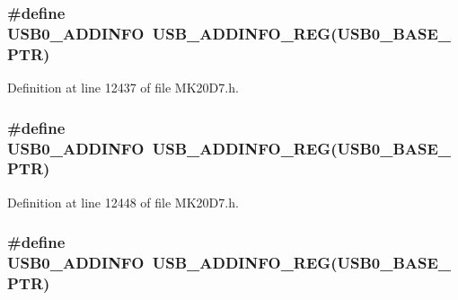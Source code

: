 \subsubsection[{\texorpdfstring{U\+S\+B0\+\_\+\+A\+D\+D\+I\+N\+FO}{USB0_ADDINFO}}]{\setlength{\rightskip}{0pt plus 5cm}\#define U\+S\+B0\+\_\+\+A\+D\+D\+I\+N\+FO~{\bf U\+S\+B\+\_\+\+A\+D\+D\+I\+N\+F\+O\+\_\+\+R\+EG}({\bf U\+S\+B0\+\_\+\+B\+A\+S\+E\+\_\+\+P\+TR})}\hypertarget{group___u_s_b___register___accessor___macros_gaff725c65f6ef8cabfafd851c6d1cb41f}{}\label{group___u_s_b___register___accessor___macros_gaff725c65f6ef8cabfafd851c6d1cb41f}


Definition at line 12437 of file M\+K20\+D7.\+h.

\subsubsection[{\texorpdfstring{U\+S\+B0\+\_\+\+A\+D\+D\+I\+N\+FO}{USB0_ADDINFO}}]{\setlength{\rightskip}{0pt plus 5cm}\#define U\+S\+B0\+\_\+\+A\+D\+D\+I\+N\+FO~{\bf U\+S\+B\+\_\+\+A\+D\+D\+I\+N\+F\+O\+\_\+\+R\+EG}({\bf U\+S\+B0\+\_\+\+B\+A\+S\+E\+\_\+\+P\+TR})}\hypertarget{group___u_s_b___register___accessor___macros_gaff725c65f6ef8cabfafd851c6d1cb41f}{}\label{group___u_s_b___register___accessor___macros_gaff725c65f6ef8cabfafd851c6d1cb41f}


Definition at line 12448 of file M\+K20\+D7.\+h.

\subsubsection[{\texorpdfstring{U\+S\+B0\+\_\+\+A\+D\+D\+I\+N\+FO}{USB0_ADDINFO}}]{\setlength{\rightskip}{0pt plus 5cm}\#define U\+S\+B0\+\_\+\+A\+D\+D\+I\+N\+FO~{\bf U\+S\+B\+\_\+\+A\+D\+D\+I\+N\+F\+O\+\_\+\+R\+EG}({\bf U\+S\+B0\+\_\+\+B\+A\+S\+E\+\_\+\+P\+TR})}\hypertarget{group___u_s_b___register___accessor___macros_gaff725c65f6ef8cabfafd851c6d1cb41f}{}\label{group___u_s_b___register___accessor___macros_gaff725c65f6ef8cabfafd851c6d1cb41f}


